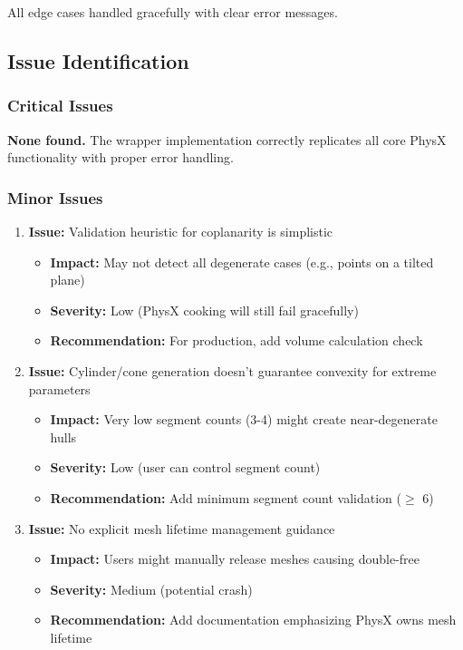 All edge cases handled gracefully with clear error messages.


\subsection{Issue Identification}

\subsubsection{Critical Issues}

\textbf{None found.} The wrapper implementation correctly replicates all core PhysX functionality with proper error handling.

\subsubsection{Minor Issues}

\begin{enumerate}
    \item \textbf{Issue:} Validation heuristic for coplanarity is simplistic
    \begin{itemize}
        \item \textbf{Impact:} May not detect all degenerate cases (e.g., points on a tilted plane)
        \item \textbf{Severity:} Low (PhysX cooking will still fail gracefully)
        \item \textbf{Recommendation:} For production, add volume calculation check
    \end{itemize}

    \item \textbf{Issue:} Cylinder/cone generation doesn't guarantee convexity for extreme parameters
    \begin{itemize}
        \item \textbf{Impact:} Very low segment counts (3-4) might create near-degenerate hulls
        \item \textbf{Severity:} Low (user can control segment count)
        \item \textbf{Recommendation:} Add minimum segment count validation ($\geq$ 6)
    \end{itemize}

    \item \textbf{Issue:} No explicit mesh lifetime management guidance
    \begin{itemize}
        \item \textbf{Impact:} Users might manually release meshes causing double-free
        \item \textbf{Severity:} Medium (potential crash)
        \item \textbf{Recommendation:} Add documentation emphasizing PhysX owns mesh lifetime
    \end{itemize}
\end{enumerate}

